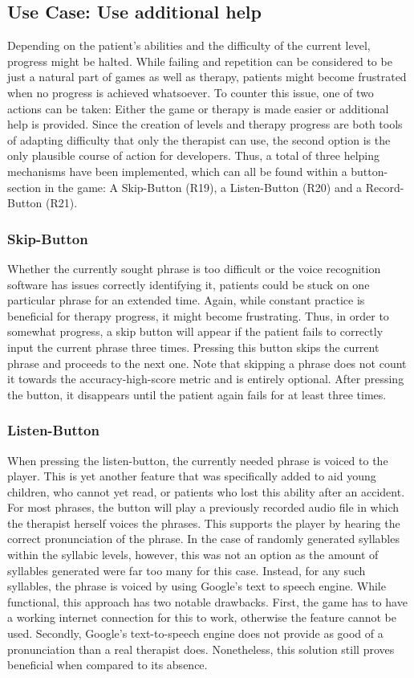 \documentclass[draft,final]{vutinfth} %
\begin{document}
\subsection{Use Case: Use additional help}
Depending on the patient's abilities and the difficulty of the current level, progress might be halted. While failing and repetition can be considered to be just a natural part of games as well as therapy, patients might become frustrated when no progress is achieved whatsoever. To counter this issue, one of two actions can be taken: Either the game or therapy is made easier or additional help is provided. Since the creation of levels and therapy progress are both tools of adapting difficulty that only the therapist can use, the second option is the only plausible course of action for developers. Thus, a total of three helping mechanisms have been implemented, which can all be found within a button-section in the game: A Skip-Button (R19), a Listen-Button (R20) and a Record-Button (R21).

\subsubsection{Skip-Button}
Whether the currently sought phrase is too difficult or the voice recognition software has issues correctly identifying it, patients could be stuck on one particular phrase for an extended time. Again, while constant practice is beneficial for therapy progress, it might become frustrating. Thus, in order to somewhat progress, a skip button will appear if the patient fails to correctly input the current phrase three times. Pressing this button skips the current phrase and proceeds to the next one. Note that skipping a phrase does not count it towards the accuracy-high-score metric and is entirely optional. After pressing the button, it disappears until the patient again fails for at least three times.

\subsubsection{Listen-Button}
When pressing the listen-button, the currently needed phrase is voiced to the player. This is yet another feature that was specifically added to aid young children, who cannot yet read, or patients who lost this ability after an accident. For most phrases, the button will play a previously recorded audio file in which the therapist herself voices the phrases. This supports the player by hearing the correct pronunciation of the phrase. In the case of randomly generated syllables within the syllabic levels, however, this was not an option as the amount of syllables generated were far too many for this case. Instead, for any such syllables, the phrase is voiced by using Google's text to speech engine. While functional, this approach has two notable drawbacks. First, the game has to have a working internet connection for this to work, otherwise the feature cannot be used. Secondly, Google's text-to-speech engine does not provide as good of a pronunciation than a real therapist does. Nonetheless, this solution still proves beneficial when compared to its absence.
\end{document}
